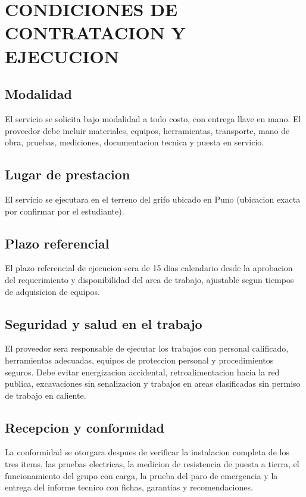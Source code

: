 \documentclass[12pt,letterpaper]{report}
\begin{document}
\section{CONDICIONES DE CONTRATACION Y EJECUCION}

\subsection{Modalidad}

El servicio se solicita bajo modalidad a todo costo, con entrega llave en mano.
El proveedor debe incluir materiales, equipos, herramientas, transporte, mano de
obra, pruebas, mediciones, documentacion tecnica y puesta en servicio.

\subsection{Lugar de prestacion}

El servicio se ejecutara en el terreno del grifo ubicado en Puno (ubicacion
exacta por confirmar por el estudiante).

\subsection{Plazo referencial}

El plazo referencial de ejecucion sera de 15 dias calendario desde la aprobacion
del requerimiento y disponibilidad del area de trabajo, ajustable segun tiempos
de adquisicion de equipos.

\subsection{Seguridad y salud en el trabajo}

El proveedor sera responsable de ejecutar los trabajos con personal calificado,
herramientas adecuadas, equipos de proteccion personal y procedimientos seguros.
Debe evitar energizacion accidental, retroalimentacion hacia la red publica,
excavaciones sin senalizacion y trabajos en areas clasificadas sin permiso de
trabajo en caliente.

\subsection{Recepcion y conformidad}

La conformidad se otorgara despues de verificar la instalacion completa de los
tres items, las pruebas electricas, la medicion de resistencia de puesta a
tierra, el funcionamiento del grupo con carga, la prueba del paro de emergencia
y la entrega del informe tecnico con fichas, garantias y recomendaciones.
\end{document}
